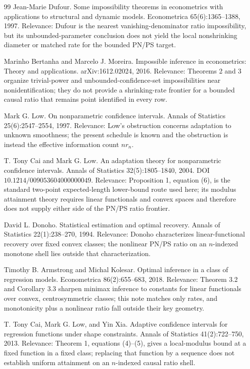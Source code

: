 \documentclass{article}
\begin{document}
\begin{thebibliography}{99}
   Jean-Marie Dufour. Some impossibility theorems in econometrics with applications to structural and dynamic models. Econometrica 65(6):1365--1388, 1997. Relevance: Dufour is the nearest vanishing-denominator ratio impossibility, but its unbounded-parameter conclusion does not yield the local nonshrinking diameter or matched rate for the bounded PN/PS target.

   Marinho Bertanha and Marcelo J. Moreira. Impossible inference in econometrics: Theory and applications. arXiv:1612.02024, 2016. Relevance: Theorems 2 and 3 organize trivial-power and unbounded-confidence-set impossibilities near nonidentification; they do not provide a shrinking-rate frontier for a bounded causal ratio that remains point identified in every row.

   Mark G. Low. On nonparametric confidence intervals. Annals of Statistics 25(6):2547--2554, 1997. Relevance: Low's obstruction concerns adaptation to unknown smoothness; the present schedule is known and the obstruction is instead the effective information count \(nr_n\).

   T. Tony Cai and Mark G. Low. An adaptation theory for nonparametric confidence intervals. Annals of Statistics 32(5):1805--1840, 2004. DOI \(10.1214/009053604000000049\). Relevance: Proposition 1, equation (6), is the standard two-point expected-length lower-bound route used here; its modulus attainment theory requires linear functionals and convex spaces and therefore does not supply either side of the PN/PS ratio frontier.

   David L. Donoho. Statistical estimation and optimal recovery. Annals of Statistics 22(1):238--270, 1994. Relevance: Donoho characterizes linear-functional recovery over fixed convex classes; the nonlinear PN/PS ratio on an \(n\)-indexed monotone shell lies outside that characterization.

   Timothy B. Armstrong and Michal Kolesar. Optimal inference in a class of regression models. Econometrica 86(2):655--683, 2018. Relevance: Theorem 3.2 and Corollary 3.3 sharpen minimax inference to constants for linear functionals over convex, centrosymmetric classes; this note matches only rates, and monotonicity plus a nonlinear ratio fall outside their key geometry.

   T. Tony Cai, Mark G. Low, and Yin Xia. Adaptive confidence intervals for regression functions under shape constraints. Annals of Statistics 41(2):722--750, 2013. Relevance: Theorem 1, equations (4)--(5), gives a local-modulus bound at a fixed function in a fixed class; replacing that function by a sequence does not establish uniform attainment on an \(n\)-indexed causal ratio shell.


\end{thebibliography}
\end{document}
